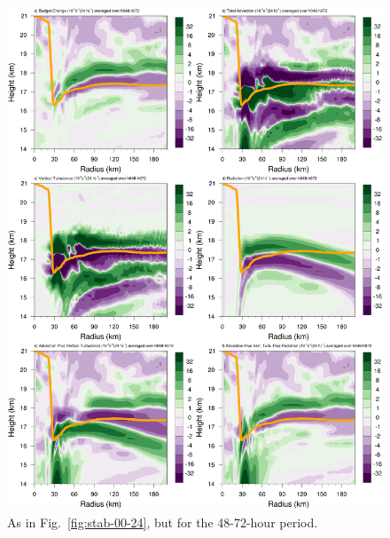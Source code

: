 \documentclass{ametsoc}
\begin{document}
\begin{figure}[ht]
\centerline{\includegraphics[width=39pc]{figures/h048-h072-budgetterms.png}}
\caption{As in Fig.~\ref{fig:stab-00-24}, but for the 48-72-hour period.}
\label{fig:stab-48-72}
\end{figure}


\end{document}
